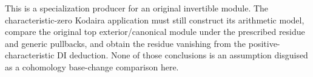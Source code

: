 \begin{remark}
This is a specialization producer for an original invertible module.
The characteristic-zero Kodaira application must still construct its
arithmetic model, compare the original top exterior/canonical module
under the prescribed residue and generic pullbacks, and obtain the
residue vanishing from the positive-characteristic DI deduction.
None of those conclusions is an assumption disguised as a
cohomology base-change comparison here.
\end{remark}
